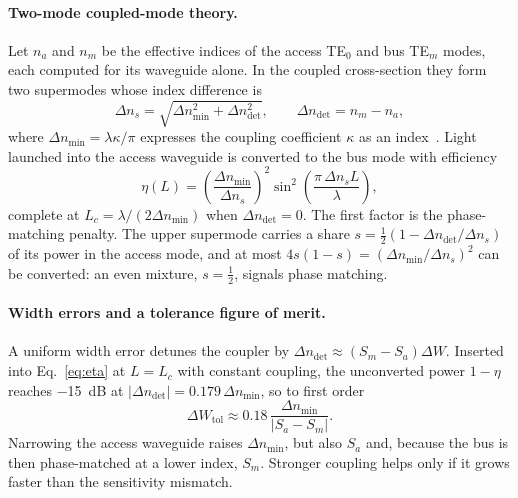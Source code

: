 \documentclass[11pt,a4paper]{article}
\newcommand{\TE}[1]{TE$_{#1}$}
\newcommand{\dn}{\Delta n}
\begin{document}
\paragraph{Two-mode coupled-mode theory.}
Let $n_a$ and $n_m$ be the effective indices of the access \TE{0} and bus \TE{m} modes,
each computed for its waveguide alone. In the coupled cross-section they form two
supermodes whose index difference is
\begin{equation}
  \dn_s = \sqrt{\dn_\mathrm{min}^2 + \dn_\mathrm{det}^2}, \qquad
  \dn_\mathrm{det} = n_m - n_a ,
  \label{eq:split}
\end{equation}
where $\dn_\mathrm{min} = \lambda\kappa/\pi$ expresses the coupling coefficient $\kappa$
as an index~\citep{yariv1973cmt}. Light launched into the access waveguide is converted
to the bus mode with efficiency
\begin{equation}
  \eta(L) = \left(\frac{\dn_\mathrm{min}}{\dn_s}\right)^2
            \sin^2\!\left(\frac{\pi\,\dn_s L}{\lambda}\right),
  \label{eq:eta}
\end{equation}
complete at $L_c = \lambda/(2\dn_\mathrm{min})$ when $\dn_\mathrm{det}=0$. The first
factor is the phase-matching penalty. The upper supermode carries a share
$s = \tfrac12(1-\dn_\mathrm{det}/\dn_s)$ of its power in the access mode, and at most
$4s(1-s) = (\dn_\mathrm{min}/\dn_s)^2$ can be converted: an even mixture, $s=\tfrac12$,
signals phase matching.

\paragraph{Width errors and a tolerance figure of merit.}
A uniform width error detunes the coupler by $\dn_\mathrm{det} \approx (S_m - S_a)\Delta W$.
Inserted into Eq.~\eqref{eq:eta} at $L = L_c$ with constant coupling, the unconverted
power $1-\eta$ reaches \qty{-15}{\dB} at $|\dn_\mathrm{det}| = 0.179\,\dn_\mathrm{min}$,
so to first order
\begin{equation}
  \Delta W_\mathrm{tol} \approx 0.18\,\frac{\dn_\mathrm{min}}{|S_a - S_m|} .
  \label{eq:fom}
\end{equation}
Narrowing the access waveguide raises $\dn_\mathrm{min}$, but also $S_a$ and, because the
bus is then phase-matched at a lower index, $S_m$. Stronger coupling helps only if it
grows faster than the sensitivity mismatch.
\end{document}
